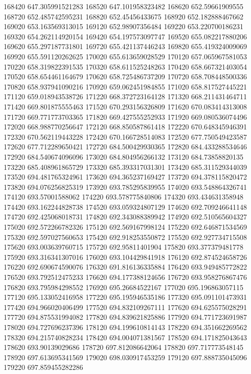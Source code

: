 {168420 647.305991521283
168520 647.101958323482
168620 652.59661909555
168720 652.485742595231
168820 652.45456433675
168920 652.182888467662
169020 653.163569313015
169120 652.98907356484
169220 653.220700186231
169320 654.262114920154
169420 654.197573097747
169520 655.082217880206
169620 655.297187731801
169720 655.421137446243
169820 655.419324009069
169920 655.591120262625
170020 655.613659028529
170120 657.065967581053
170220 658.319822391535
170320 658.611525248263
170420 658.667321403054
170520 658.654461164679
170620 658.725486737209
170720 658.708448500336
170820 658.937941090216
170920 659.062451984855
171020 658.817527445221
171120 659.018943538726
171220 668.372723164128
171320 668.211431464711
171420 669.801875555463
171520 670.293156326809
171620 670.083414313008
171720 669.771773703365
171820 669.427555252933
171920 669.080536074496
172020 668.988770256647
172120 668.850587861418
172220 670.648345946391
172320 670.562119443228
172420 670.166728514083
172520 677.750549423587
172620 677.712289650421
172720 684.500429930365
172820 684.433288534646
172920 684.540674096096
173020 684.804956266132
173120 684.73858820135
173220 685.408961865729
173320 685.393317031301
173420 685.311529344039
173520 694.481765324961
173620 694.365237169427
173720 694.378115820472
173820 694.076256825319
173920 693.785295839955
174020 693.548864326741
174120 693.57001588062
174220 693.578775840806
174320 693.434631358948
174420 693.162244828738
174520 693.059324807129
174620 692.709246641148
174720 692.425068018731
174820 692.343088389942
174920 692.510565604327
175020 692.572266782326
175120 692.569167998124
175220 692.646871534569
175320 692.597027560653
175420 692.918253550872
175520 692.927734715508
175620 693.003639760715
175720 692.95811401904
175820 693.377379481778
175920 693.316341307016
176020 693.104429841918
176120 692.874524658726
176220 692.690674590076
176320 691.816136335884
176420 693.949485772822
176520 693.792512475233
176620 694.177388124656
176720 693.958276867476
176820 693.795984298552
176920 695.26684522167
177020 695.196863057115
177120 695.133052416958
177220 695.195946535186
177320 695.091101473931
177420 694.966020406499
177520 694.832109267111
177620 694.625575028291
177720 694.875531994082
177820 694.839621825886
177920 694.771723691987
178020 694.727696237396
178120 694.199610814143
178220 694.351662269562
178320 694.215740828234
178420 694.004071381567
178520 694.171825043643
178620 693.90139029686
178720 697.812086642064
178820 697.717773548145
178920 697.613695341569
179020 698.030917453259
179120 697.888735045096
179220 697.859455282286
}
